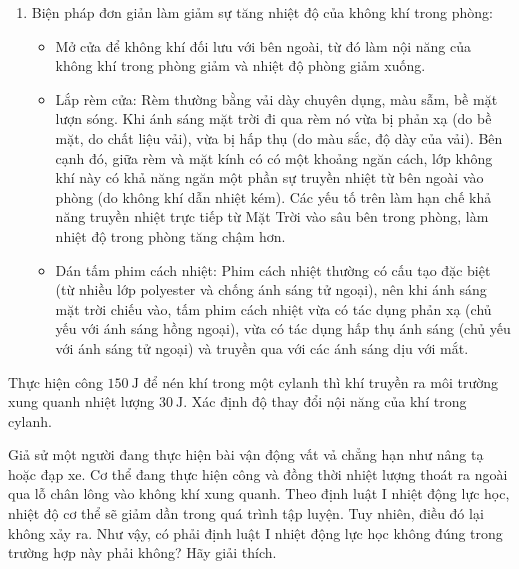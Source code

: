 \begin{ex}
{\begin{enumerate}[label=\alph*)]
	\item Biện pháp đơn giản làm giảm sự tăng nhiệt độ của không khí trong phòng:
	\begin{itemize}
		\item Mở cửa để không khí đối lưu với bên ngoài, từ đó làm nội năng của không khí trong phòng giảm và nhiệt độ phòng giảm xuống.
		\item Lắp rèm cửa: Rèm thường bằng vải dày chuyên dụng, màu sẫm, bề mặt lượn sóng. Khi ánh sáng mặt trời đi qua rèm nó vừa bị phản xạ (do bề mặt, do chất liệu vải), vừa bị hấp thụ (do màu sắc, độ dày của vải). Bên cạnh đó, giữa rèm và mặt kính có có một khoảng ngăn cách, lớp không khí này có khả năng ngăn một phần sự truyền nhiệt từ bên ngoài vào phòng (do không khí dẫn nhiệt kém). Các yếu tố trên làm hạn chế khả năng truyền nhiệt trực tiếp từ Mặt Trời vào sâu bên trong phòng, làm nhiệt độ trong phòng tăng chậm hơn.
		\item Dán tấm phim cách nhiệt: Phim cách nhiệt thường có cấu tạo đặc biệt (từ nhiều lớp polyester và chống ánh sáng tử ngoại), nên khi ánh sáng mặt trời chiếu vào, tấm phim cách nhiệt vừa có tác dụng phản xạ (chủ yếu với ánh sáng hồng ngoại), vừa có tác dụng hấp thụ ánh sáng (chủ yếu với ánh sáng tử ngoại) và truyền qua với các ánh sáng dịu với mắt.
	\end{itemize}
\end{enumerate}
}
	\end{ex}
\begin{ex}
	Thực hiện công $\SI{150}{\joule}$ để nén khí trong một cylanh thì khí truyền ra môi trường xung quanh nhiệt lượng $\SI{30}{\joule}$. Xác định độ thay đổi nội năng của khí trong cylanh.
	\end{ex}

\begin{ex}
	Giả sử một người đang thực hiện bài vận động vất vả chẳng hạn như nâng tạ hoặc đạp xe. Cơ thể đang thực hiện công và đồng thời nhiệt lượng thoát ra ngoài qua lỗ chân lông vào không khí xung quanh. Theo định luật I nhiệt động lực học, nhiệt độ cơ thể sẽ giảm dần trong quá trình tập luyện. Tuy nhiên, điều đó lại không xảy ra. Như vậy, có phải định luật I nhiệt động lực học không đúng trong trường hợp này phải không? Hãy giải thích.
	\end{ex}

